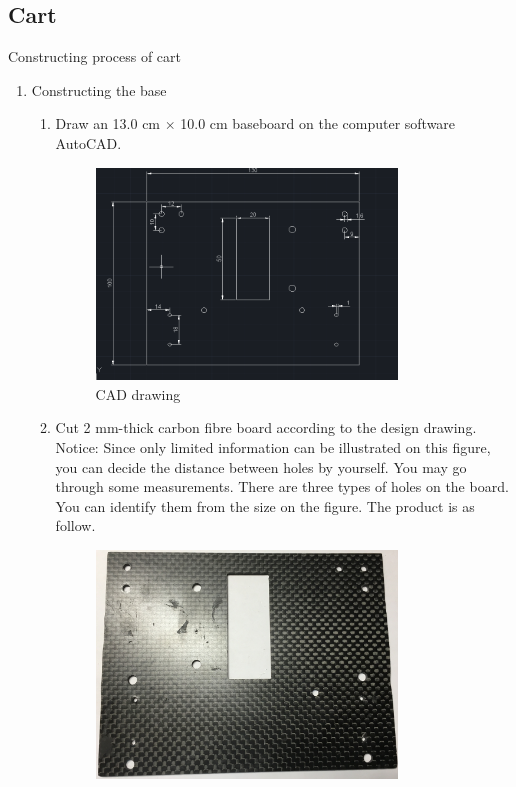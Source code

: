 \subsection{Cart}
Constructing process of cart
\begin{enumerate}
\item Constructing the base
	\begin{enumerate}
	\item	Draw an 13.0 cm $\times$ 10.0 cm baseboard on the computer software AutoCAD.\\
	\begin{figure}[H]
	\begin{center}
	\includegraphics[width=8cm]{figure/procedure/p1}
	\end{center}
 	\caption{CAD drawing \label{fig:cad}}
	\end{figure}
	\item Cut 2 mm-thick carbon fibre board according to the design drawing. Notice: Since only limited information can be illustrated on this figure, you can decide the distance between holes by yourself. You may go through some measurements. There are three types of holes on the board. You can identify them from the size on the figure. The product is as follow. \\
	\begin{figure}[H]
	\begin{center}
	\includegraphics[width=8cm]{figure/procedure/p2}

\end{center}
\end{figure}
\end{enumerate}
\end{enumerate}
